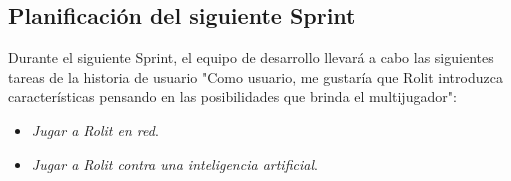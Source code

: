 \documentclass[../../FINAL/Scrum/SCRUM.tex]{subfiles}
\begin{document}
\subsection{Planificación del siguiente Sprint}
Durante el siguiente Sprint, el equipo de desarrollo llevará a cabo las siguientes tareas de la historia de usuario "Como usuario, me gustaría que Rolit introduzca características pensando en las posibilidades que brinda el multijugador":
\begin{itemize}
\item \textit{Jugar a Rolit en red}.
\item \textit{Jugar a Rolit contra una inteligencia artificial}.
\end{itemize}
\end{document}
